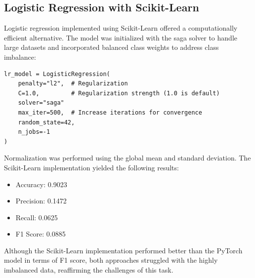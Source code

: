 \documentclass[8pt,a4paper]{article}
\begin{document}
\subsection{Logistic Regression with Scikit-Learn}
Logistic regression implemented using Scikit-Learn offered a computationally efficient alternative. The model was initialized with the saga solver to handle large datasets and incorporated balanced class weights to address class imbalance:

\begin{lstlisting}
lr_model = LogisticRegression(
    penalty="l2",  # Regularization
    C=1.0,         # Regularization strength (1.0 is default)
    solver="saga"
    max_iter=500,  # Increase iterations for convergence
    random_state=42,
    n_jobs=-1
)
\end{lstlisting}
Normalization was performed using the global mean and standard deviation. The Scikit-Learn implementation yielded the following results:
\begin{itemize}
\item Accuracy: 0.9023
\item Precision: 0.1472
\item Recall: 0.0625
\item F1 Score: 0.0885
\end{itemize}
Although the Scikit-Learn implementation performed better than the PyTorch model in terms of F1 score, both approaches struggled with the highly imbalanced data, reaffirming the challenges of this task.
\end{document}
